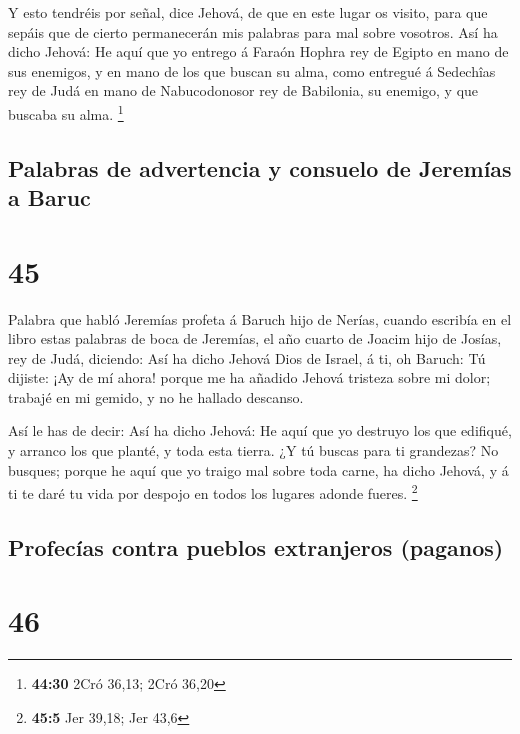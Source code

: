  Y esto tendréis por señal, dice Jehová, de que en este
lugar os visito, para que sepáis que de cierto permanecerán mis palabras
para mal sobre vosotros.  Así ha dicho Jehová: He aquí
que yo entrego á Faraón Hophra rey de Egipto en mano de sus enemigos, y
en mano de los que buscan su alma, como entregué á Sedechîas rey de Judá
en mano de Nabucodonosor rey de Babilonia, su enemigo, y que buscaba su
alma. \footnote{\textbf{44:30} 2Cró 36,13; 2Cró 36,20}

\hypertarget{palabras-de-advertencia-y-consuelo-de-jeremuxedas-a-baruc}{%
\subsection{Palabras de advertencia y consuelo de Jeremías a
Baruc}\label{palabras-de-advertencia-y-consuelo-de-jeremuxedas-a-baruc}}

\hypertarget{section-44}{%
\section{45}\label{section-44}}

 Palabra que habló Jeremías profeta á Baruch hijo de
Nerías, cuando escribía en el libro estas palabras de boca de Jeremías,
el año cuarto de Joacim hijo de Josías, rey de Judá, diciendo:
 Así ha dicho Jehová Dios de Israel, á ti, oh Baruch:
 Tú dijiste: ¡Ay de mí ahora! porque me ha añadido Jehová
tristeza sobre mi dolor; trabajé en mi gemido, y no he hallado descanso.

 Así le has de decir: Así ha dicho Jehová: He aquí que yo
destruyo los que edifiqué, y arranco los que planté, y toda esta tierra.
 ¿Y tú buscas para ti grandezas? No busques; porque he
aquí que yo traigo mal sobre toda carne, ha dicho Jehová, y á ti te daré
tu vida por despojo en todos los lugares adonde fueres. \footnote{\textbf{45:5}
  Jer 39,18; Jer 43,6}

\hypertarget{profecuxedas-contra-pueblos-extranjeros-paganos}{%
\subsection{Profecías contra pueblos extranjeros
(paganos)}\label{profecuxedas-contra-pueblos-extranjeros-paganos}}

\hypertarget{section-45}{%
\section{46}\label{section-45}}

